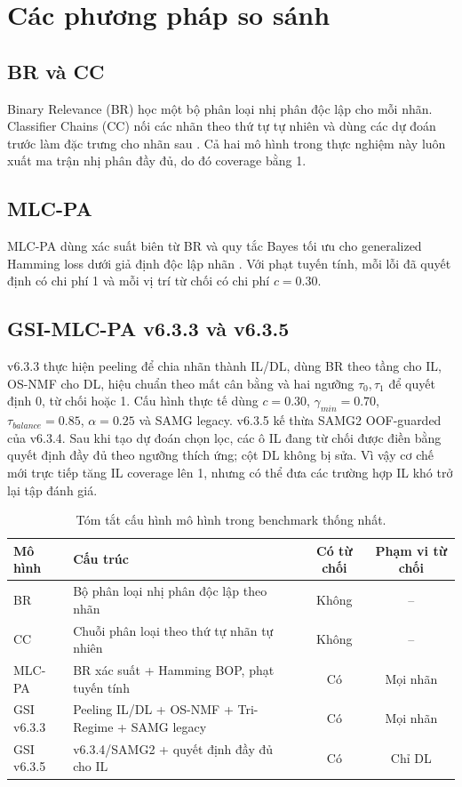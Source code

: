 \documentclass[11pt,a4paper,twoside]{article}
\begin{document}
\section{Các phương pháp so sánh}
\subsection{BR và CC}
Binary Relevance (BR) học một bộ phân loại nhị phân độc lập cho mỗi nhãn. Classifier Chains (CC) nối các nhãn theo thứ tự tự nhiên và dùng các dự đoán trước làm đặc trưng cho nhãn sau \cite{read2011}. Cả hai mô hình trong thực nghiệm này luôn xuất ma trận nhị phân đầy đủ, do đó coverage bằng 1.
\subsection{MLC-PA}
MLC-PA dùng xác suất biên từ BR và quy tắc Bayes tối ưu cho generalized Hamming loss dưới giả định độc lập nhãn \cite{nguyen2021}. Với phạt tuyến tính, mỗi lỗi đã quyết định có chi phí 1 và mỗi vị trí từ chối có chi phí $c=0.30$.
\subsection{GSI-MLC-PA v6.3.3 và v6.3.5}
v6.3.3 thực hiện peeling để chia nhãn thành IL/DL, dùng BR theo tầng cho IL, OS-NMF cho DL, hiệu chuẩn theo mất cân bằng và hai ngưỡng $\tau_0,\tau_1$ để quyết định 0, từ chối hoặc 1. Cấu hình thực tế dùng $c=0.30$, $\gamma_{min}=0.70$, $\tau_{balance}=0.85$, $\alpha=0.25$ và SAMG legacy.
v6.3.5 kế thừa SAMG2 OOF-guarded của v6.3.4. Sau khi tạo dự đoán chọn lọc, các ô IL đang từ chối được điền bằng quyết định đầy đủ theo ngưỡng thích ứng; cột DL không bị sửa. Vì vậy cơ chế mới trực tiếp tăng IL coverage lên 1, nhưng có thể đưa các trường hợp IL khó trở lại tập đánh giá.
\begin{table}[H]\centering
\caption{Tóm tắt cấu hình mô hình trong benchmark thống nhất.}
\label{tab:models}\small
\begin{tabularx}{\textwidth}{lXcc}\toprule
Mô hình & Cấu trúc & Có từ chối & Phạm vi từ chối \\\midrule
BR & Bộ phân loại nhị phân độc lập theo nhãn & Không & -- \\
CC & Chuỗi phân loại theo thứ tự nhãn tự nhiên & Không & -- \\
MLC-PA & BR xác suất + Hamming BOP, phạt tuyến tính & Có & Mọi nhãn \\
GSI v6.3.3 & Peeling IL/DL + OS-NMF + Tri-Regime + SAMG legacy & Có & Mọi nhãn \\
GSI v6.3.5 & v6.3.4/SAMG2 + quyết định đầy đủ cho IL & Có & Chỉ DL \\
\bottomrule\end{tabularx}\end{table}
\end{document}
